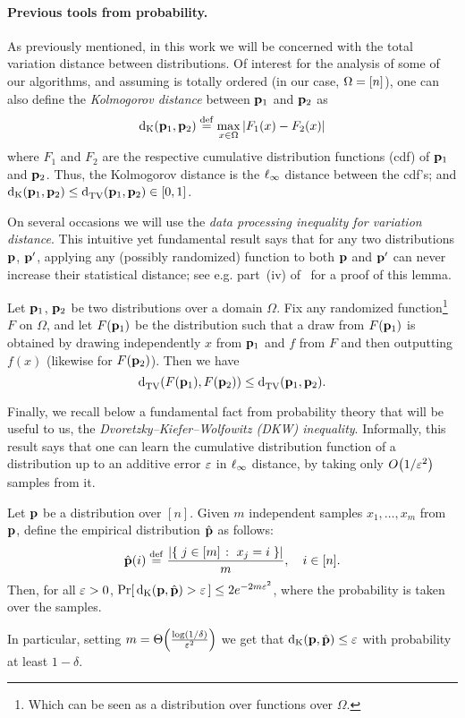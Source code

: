 \paragraph{Previous tools from probability.}
As previously mentioned, in this work we will be concerned with the total variation distance between distributions. Of interest for the analysis of some of our algorithms, and assuming \domain is totally ordered (in our case, $\domain=[n]$), one can also define the \emph{Kolmogorov distance} between $\D_1$ and $\D_2$ as
\begin{equation}\label{eq:def:dk}
  \kolmogorov{\D_1}{\D_2} \eqdef \max_{x\in \domain}\abs{F_1(x)-F_2(x)}
\end{equation}
where $F_1$ and $F_2$ are the respective cumulative distribution functions (cdf) of $\D_1$ and $\D_2$. Thus, the Kolmogorov distance is the $\lp[\infty]$ distance between the cdf's; and $\kolmogorov{\D_1}{\D_2} \leq \totalvardist{\D_1}{\D_2} \in [0,1]$. \smallskip

On several occasions we will use the \emph{data processing inequality for variation distance}.  This intuitive yet fundamental result says that for any two distributions $\D$, $\D'$,
applying any (possibly randomized) function to both $\D$ and $\D'$ can never increase their statistical distance; see e.g. part~(iv) of~\cite[Lemma 2]{Rey:11} for a proof of this
lemma.
\begin{fact}\label{lemma:data:processing:inequality:total:variation}
Let $\D_1$, $\D_2$ be two distributions over a domain $\Omega$. Fix any randomized function\footnote{Which can be seen as a distribution over functions over $\Omega$.}{} $F$ on $\Omega$, and let $F(\D_1)$ be the distribution such that a draw from $F(\D_1)$ is obtained by drawing independently $x$ from $\D_1$ and $f$ from $F$ and then outputting $f(x)$ (likewise for $F(\D_2)$).
Then we have
\[
\totalvardist{ F(\D_1) }{  F(\D_2) }  \leq \totalvardist{ \D_1 }{ \D_2 }.
\]
\end{fact}

Finally, we recall below a fundamental fact from probability theory that will be useful to us, the \emph{Dvoretzky--Kiefer--Wolfowitz (DKW) inequality}. Informally, this result says that one can learn the cumulative distribution function of a distribution up to an additive error $\eps$ in $\lp[\infty]$ distance, by taking only $\bigO{1/\eps^2}$ samples from it.
\begin{theorem}\label{theo:dkw}
Let $\D$ be a distribution over $[n]$. Given $m$ independent samples $x_1,\dots ,x_m$ from $\D$, define the empirical distribution $\hat{\D}$ as follows:
\[
\hat{\D}(i) \eqdef \frac{\abs{ \setOfSuchThat{j\in[m]}{x_j=i} } }{m}, \quad i\in[n].
\]
Then, for all $\eps > 0$, $\probaOf{ \kolmogorov{\D}{\hat{\D}} > \eps } \leq 2e^{-2m\eps^2}$, where the probability is taken over the samples.
\end{theorem} 
\noindent In particular, setting $m=\bigTheta{\frac{\log(1/\delta)}{\eps^2}}$ we get that $\kolmogorov{\D}{\hat{\D}} \leq \eps$ with probability at least $1-\delta$.

